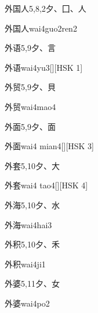 \begin{entry}{外国人}{5,8,2}{⼣、⼞、⼈}
  \begin{phonetics}{外国人}{wai4guo2ren2}
  \end{phonetics}
\end{entry}

\begin{entry}{外语}{5,9}{⼣、⾔}
  \begin{phonetics}{外语}{wai4yu3}[][HSK 1]
  \end{phonetics}
\end{entry}

\begin{entry}{外贸}{5,9}{⼣、⾙}
  \begin{phonetics}{外贸}{wai4mao4}
  \end{phonetics}
\end{entry}

\begin{entry}{外面}{5,9}{⼣、⾯}
  \begin{phonetics}{外面}{wai4 mian4}[][HSK 3]
  \end{phonetics}
\end{entry}

\begin{entry}{外套}{5,10}{⼣、⼤}
  \begin{phonetics}{外套}{wai4 tao4}[][HSK 4]
  \end{phonetics}
\end{entry}

\begin{entry}{外海}{5,10}{⼣、⽔}
  \begin{phonetics}{外海}{wai4hai3}
  \end{phonetics}
\end{entry}

\begin{entry}{外积}{5,10}{⼣、⽲}
  \begin{phonetics}{外积}{wai4ji1}
  \end{phonetics}
\end{entry}

\begin{entry}{外婆}{5,11}{⼣、⼥}
  \begin{phonetics}{外婆}{wai4po2}
  \end{phonetics}
\end{entry}

